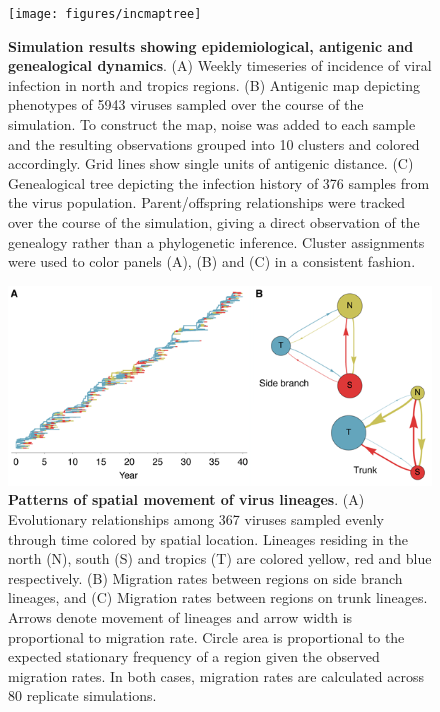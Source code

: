 \begin{figure}[H]
	\centering
	\texttt{[image: figures/incmaptree]}
	\caption{\textbf{Simulation results showing epidemiological, antigenic and genealogical dynamics}. (A) Weekly timeseries of incidence of viral infection in north and tropics regions. (B) Antigenic map depicting phenotypes of 5943 viruses sampled over the course of the simulation.  To construct the map, noise was added to each sample and the resulting observations grouped into 10 clusters and colored accordingly.  Grid lines show single units of antigenic distance. (C) Genealogical tree depicting the infection history of 376 samples from the virus population.  Parent/offspring relationships were tracked over the course of the simulation, giving a direct observation of the genealogy rather than a phylogenetic inference. Cluster assignments were used to color panels (A), (B) and (C) in a consistent fashion.}
	\label{incmaptree}
\end{figure}

\pagebreak

\begin{figure}[H]
	\centering
	\includegraphics{figures/spatial}
	\caption{\textbf{Patterns of spatial movement of virus lineages}. (A) Evolutionary relationships among 367 viruses sampled evenly through time colored by spatial location. Lineages residing in the north (N), south (S) and tropics (T) are colored yellow, red and blue respectively. (B) Migration rates between regions on side branch lineages, and (C) Migration rates between regions on trunk lineages. Arrows denote movement of lineages and arrow width is proportional to migration rate. Circle area is proportional to the expected stationary frequency of a region given the observed migration rates.  In both cases, migration rates are calculated across 80 replicate simulations.}
	\label{spatial}
\end{figure}

